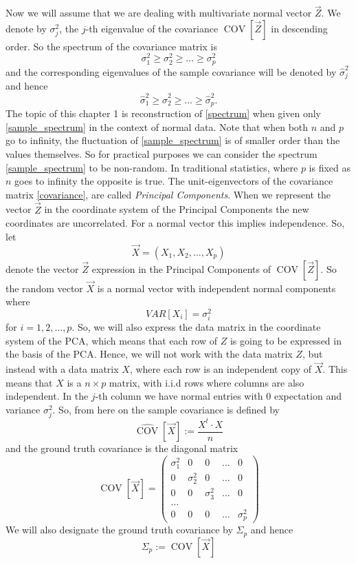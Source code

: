 \documentclass[12pt]{amsart}
\theoremstyle{definition}
\DeclareMathOperator{\Cov}{COV}
\numberwithin{equation}{section}
\numberwithin{equation}{section}
\theoremstyle{remark}
\numberwithin{equation}{section}
\begin{document}
Now we will assume that we are dealing with multivariate normal vector $\vec{Z}$. We denote by $\sigma^2_j$, the $j$-th eigenvalue of the covariance $\Cov[\vec{Z}]$ in descending order. So the spectrum of the covariance matrix is
\begin{equation}
\label{spectrum}
\sigma_1^2\geq \sigma_2^2\geq\ldots\geq\sigma_p^2
\end{equation}
and the corresponding eigenvalues of the sample covariance will  be denoted by $\hat{\sigma}^2_j$
and hence
\begin{equation}
\label{sample_spectrum}
\hat{\sigma}_1^2\geq \hat{\sigma}_2^2\geq\ldots\geq\hat{\sigma}_p^2.
\end{equation}
The topic of this chapter 1 is reconstruction of \ref{spectrum} when given only \ref{sample_spectrum}
in the context of normal data. Note that when both $n$ and $p$ go to infinity, the fluctuation of \ref{sample_spectrum} is of smaller order than the values themselves. So for practical purposes we can consider the spectrum \ref{sample_spectrum} to be non-random. In traditional statistics, where $p$ is fixed as $n$ goes to infinity the opposite is true. The unit-eigenvectors of the covariance matrix \ref{covariance}, are called {\it Principal Components}. When we represent the vector $\vec{Z}$ in  the coordinate system of the Principal Components
the new coordinates are uncorrelated. For a normal vector this implies independence. So, let
$$\vec{X}=(X_1,X_2,\ldots,X_p)$$
denote the vector $\vec{Z}$ expression in the Principal Components of $\Cov[\vec{Z}]$.
So the random vector $\vec{X}$ is a normal vector with independent normal components where
$$VAR[X_i]=\sigma^2_i$$
for $i= 1,2,\ldots,p$. So, we will also express the data matrix in the coordinate system of the PCA, which means that each row of $Z$ is going to be expressed in the basis of the PCA. Hence, we will not work with the data matrix $Z$, but instead with a data matrix $X$, where each row is an independent copy of $\vec{X}$. This means that
$X$ is a $n\times p$ matrix, with i.i.d rows where columns are also independent. In the $j$-th column we have normal entries with $0$ expectation and variance $\sigma_j^2$. So, from here on the sample covariance is defined by
$$\hat{\Cov}[\vec{X}]:=\frac{X^t\cdot X}{n}$$
and the ground truth covariance is the diagonal matrix
$$\Cov[\vec{X}]=\left(
\begin{array}{ccccccccc}
\sigma_1^2&0&0&\ldots&0\\
0&\sigma^2_2&0&\ldots&0\\
0&0&\sigma^2_3&\ldots&0\\
\ldots\\
0&0&0&\ldots&\sigma^2_p
\end{array}\right)
$$
We will also designate the ground truth covariance by $\Sigma_p$
and hence
$$\Sigma_p:=\Cov[\vec{X}]$$
\end{document}
